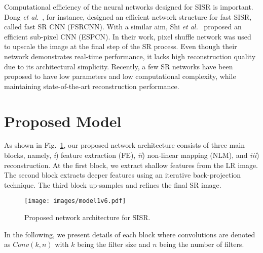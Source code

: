 \documentclass[a4paper,11pt]{article}
\begin{document}
Computational efficiency of the neural networks designed for SISR is important. Dong \textit{et al.}~\cite{FSRCNN}, for instance, designed an efficient network structure for fast SISR, called fast SR CNN (FSRCNN). With a similar aim, Shi \textit{et al.}~\cite{ESPCN} proposed an efficient sub-pixel CNN (ESPCN). In their work, pixel shuffle network was used to upscale the image at the final step of the SR process. Even though their network demonstrates real-time performance, it lacks high reconstruction quality due to its architectural simplicity. Recently, a few SR networks \cite{CARN,IDN,FLSR} have been proposed to have low parameters and low computational complexity, while maintaining state-of-the-art reconstruction performance.  

































 \section{Proposed Model}
\label{model}




As shown in Fig.~\ref{fig:network}, our proposed network  architecture consists of three main blocks, namely, \textit{i}) feature extraction (FE), \textit{ii}) non-linear mapping (NLM), and \textit{iii}) reconstruction. At the first block, we extract shallow features from the LR image. The second block extracts deeper features using an iterative back-projection technique. The third block up-samples and refines the final SR image.
\begin{figure}[t]
    \centering
    \texttt{[image: images/model1v6.pdf]}
\caption{Proposed network architecture for SISR.}

    \label{fig:network}
\end{figure}
In the following, we present details of each block where convolutions are denoted as $Conv(k, n)$ with $k$ being the filter size and $n$ being the number of filters. 
\end{document}
